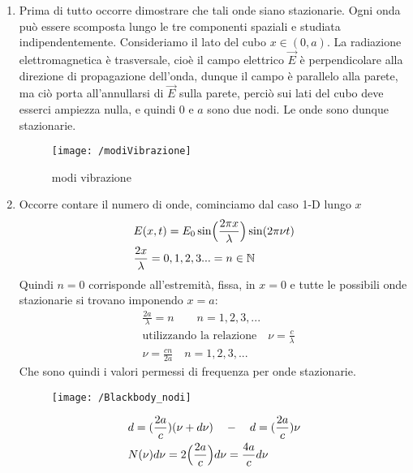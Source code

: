 \begin{enumerate}[label=\Roman{*}.]
\item Prima di tutto occorre dimostrare che tali onde siano stazionarie.
Ogni onda può essere scomposta lungo le tre componenti spaziali e studiata indipendentemente. 
Consideriamo il lato del cubo $x \in (0, a)$.
La radiazione elettromagnetica è trasversale, cioè il campo elettrico $\vec{E}$ è perpendicolare alla direzione di propagazione dell'onda, dunque il campo è parallelo alla parete, ma ciò porta all'annullarsi di $\vec{E}$ sulla parete, perciò sui lati del cubo deve esserci ampiezza nulla, e quindi $0$ e $a$ sono due nodi.
Le onde sono dunque stazionarie.
\begin{figure}[h]
\centering
\texttt{[image: /modiVibrazione]}
\caption{modi vibrazione}
\end{figure}
\item Occorre contare il numero di onde, cominciamo dal caso 1-D lungo $x$
\begin{equation}
\begin{split}
& E(x, t) = E_0 \sin \Bigl(  \frac{2 \pi x}{\lambda}  \Bigr) \sin (2\pi \nu t) \\
& \frac{2x}{\lambda} = 0,1,2,3 ... = n \in \mathbb{N}
\end{split}
\end{equation}
Quindi $n=0$ corrisponde all'estremità, fissa, in $x=0$ e tutte le possibili onde stazionarie si trovano imponendo $x=a$:
\begin{equation}
\begin{split}
& \frac{ 2a}{\lambda } = n \quad\quad n = 1,2,3, ... \\
& \mbox{utilizzando la relazione} \quad \nu = \frac{c}{\lambda} \\
& \nu = \frac{ c n }{2a } \quad n = 1,2,3, ...
\end{split}
\end{equation}
Che sono quindi i valori permessi di frequenza per onde stazionarie.
\begin{figure}[h]
\centering
\texttt{[image: /Blackbody\_nodi]}
\end{figure}
\begin{equation}
\begin{split}
& d = (\frac{ 2a}{c }) (\nu + d\nu) \quad - \quad d = (\frac{ 2a}{c }) \nu \\
& N(\nu)d\nu = 2 \Bigl(  \frac{2a}{c}  \Bigr) d\nu = \frac{4a}{c}d\nu 
\end{split}
\end{equation}

\end{enumerate}
